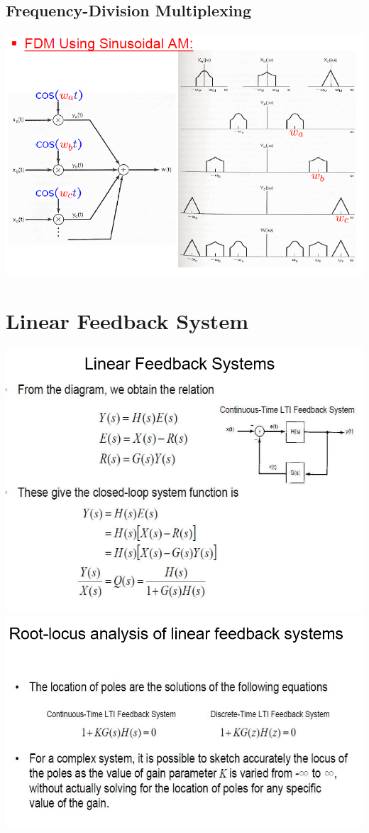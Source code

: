\documentclass[landscape,a4paper]{article}
\begin{document}
\begin{multicols}{3}
\subsection{Frequency-Division Multiplexing}
\includegraphics[width=\linewidth]{8.3.png}

\setcounter{section}{10}

\section{Linear Feedback System}
\includegraphics[width=0.8\linewidth]{11.1.png}
\includegraphics[width=0.8\linewidth]{11.2.png}


\end{multicols}
\end{document}
